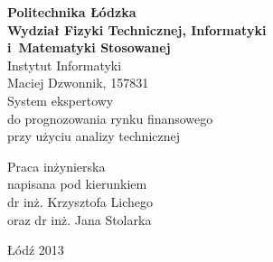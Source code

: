 \begin{titlepage}
\begin{center}
\textbf{{\large Politechnika Łódzka}\\}
\vspace{\medskipamount}
\textbf{\large Wydział Fizyki Technicznej, Informatyki\\i~Matematyki Stosowanej}
\vspace{\medskipamount}\\
{\large Instytut Informatyki}\\
\vspace{2.5cm}
{\Large {Maciej Dzwonnik, 157831\\}}
\vspace{2cm}
{\huge{ {System ekspertowy \\do prognozowania rynku finansowego \\przy użyciu analizy technicznej\\}}}
\end{center}
\vspace{3cm}
\hfill
\begin{minipage}{.55\columnwidth}
Praca {inżynierska}\\
napisana pod kierunkiem\\
dr inż. Krzysztofa Lichego\\
oraz dr inż. Jana Stolarka
\end{minipage}
\vfill
\begin{center}
Łódź {2013}
\end{center}
\end{titlepage}
